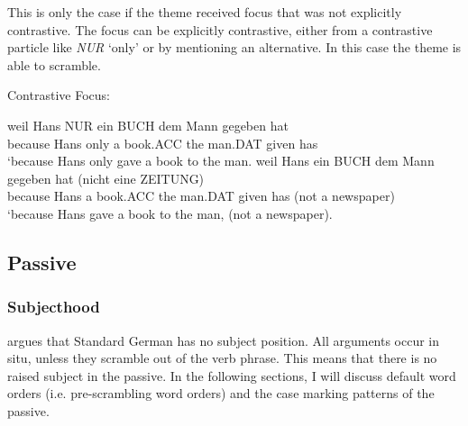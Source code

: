 This is only the case if the theme received focus that was not explicitly contrastive. The focus can be explicitly contrastive, either from a contrastive particle like \emph{NUR} `only' or by mentioning an alternative. In this case the theme is able to scramble.
\begin{exe}
\ex Contrastive Focus:
\begin{xlist}
\ex \gll weil Hans NUR ein BUCH dem Mann gegeben hat\\
because Hans only a book.ACC the man.DAT given has\\
\trans `because Hans only gave a book to the man.
\ex \gll weil Hans ein BUCH dem Mann gegeben hat (nicht eine ZEITUNG)\\
because Hans a book.ACC the man.DAT given has (not a newspaper)\\
\trans `because Hans gave a book to the man, (not a newspaper).
\end{xlist}
\end{exe}

\subsection{Passive}
\subsubsection{Subjecthood}
\cite{Besten.1990} argues that Standard German has no subject position. All arguments occur in situ, unless they scramble out of the verb phrase. This means that there is no raised subject in the passive. In the following sections, I will discuss default word orders (i.e. pre-scrambling word orders) and the case marking patterns of the passive.
